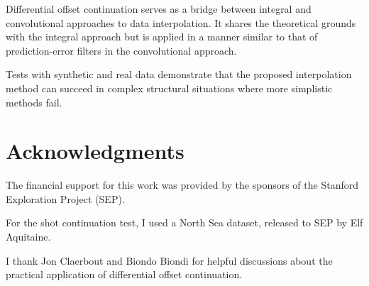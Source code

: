 Differential offset continuation serves as a bridge between integral
and convolutional approaches to data interpolation. It shares the
theoretical grounds with the integral approach but is applied in a
manner similar to that of prediction-error filters in the
convolutional approach.

Tests with synthetic and real data demonstrate that the proposed
interpolation method can succeed in complex structural situations
where more simplistic methods fail.

\section{Acknowledgments}

The financial support for this work was provided by the sponsors of
the Stanford Exploration Project (SEP).


For the shot continuation test, I used a
North Sea dataset, released to SEP by Elf Aquitaine.

I thank Jon Claerbout and Biondo Biondi for helpful discussions about
the practical application of differential offset continuation.

\newpage




